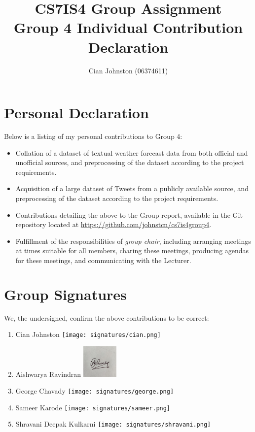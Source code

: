 \documentclass[a4paper,10pt]{article}
\begin{document}
\title{
    CS7IS4 Group Assignment \\
    \large Group 4 Individual Contribution Declaration
}
\author{
    Cian Johnston (06374611)
}

\maketitle

\section{Personal Declaration}

Below is a listing of my personal contributions to Group 4:

\begin{itemize}
    \item{
        Collation of a dataset of textual weather forecast data from both official and unofficial sources, and preprocessing of the dataset according to the project requirements.
    }
    \item{
        Acquisition of a large dataset of Tweets from a publicly available source, and preprocessing of the dataset according to the project requirements.
    }
    \item{
        Contributions detailing the above to the Group report, available in the Git repository located at \url{https://github.com/johnstcn/cs7is4group4}.
    }
    \item{
        Fulfillment of the responsibilities of \textit{group chair}, including arranging meetings at times suitable for all members, charing these meetings, producing agendas for these meetings, and communicating with the Lecturer. 
    }
\end{itemize}

\section{Group Signatures}

We, the undersigned, confirm the above contributions to be correct:

\begin{enumerate}
    \item{
        Cian Johnston \texttt{[image: signatures/cian.png]}
    }
    \item{
        Aishwarya Ravindran \includegraphics[width=0.7in]{signatures/Aishwarya.jpeg}
    }
    \item{
        George Chavady \texttt{[image: signatures/george.png]}
    }
    \item{
        Sameer Karode \texttt{[image: signatures/sameer.png]}
    }
    \item{
        Shravani Deepak Kulkarni \texttt{[image: signatures/shravani.png]}
    }

\end{enumerate}
\end{document}
